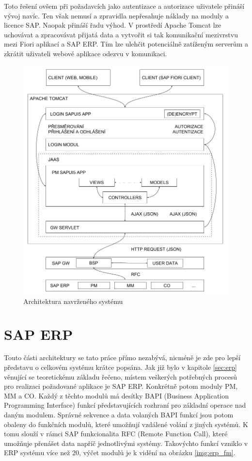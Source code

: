 \documentclass[thesis=M,czech]{FITthesis}[2012/06/26]
\begin{document}
Toto řešení ovšem při požadavcích jako autentizace a autorizace uživatele přináší vývoj navíc. Ten však nemusí a zpravidla nepřesahuje náklady na moduly a licence SAP. Naopak přináší řadu výhod. V prostředí Apache Tomcat lze uchovávat a zpracovávat přijatá data a vytvořit si tak komunikační mezivrstvu mezi Fiori aplikací a SAP ERP. Tím lze ulehčit potenciálně zatíženým serverům a zkrátit uživateli webové aplikace odezvu v komunikaci.

\begin{figure}[H]
	\centering
	\includegraphics[width=1\textwidth]{images/architektura}
	\caption{Architektura navrženého systému}
	\label{img:architektura}
\end{figure}

\section{SAP ERP}
Touto části architektury se tato práce přímo nezabývá, nicméně je zde pro lepší představu o celkovém systému krátce popsána. Jak již bylo v kapitole \ref{sec:erp} věnující se teoretickému základu řečeno, místem veškerých potřebných procesů pro realizaci požadované aplikace je SAP ERP. Konkrétně potom moduly PM, MM a CO. Každý z těchto modulů má desítky BAPI (Business Application Programming Interface) funkcí představujících rozhraní pro základní operace nad daným modulem. Správné sekvence a data volaných BAPI funkcí jsou potom obaleny do funkčních modulů, které umožňují vzdálené volání z jiných systémů. K tomu slouží v rámci SAP funkcionalita RFC (Remote Function Call), které umožňuje přenášet data napříč jednotlivými systémy. Takovýchto funkcí vzniklo v ERP systému více než 20, výčet modulů je k vidění na obrázku \ref{img:erp_fm}.
\end{document}
